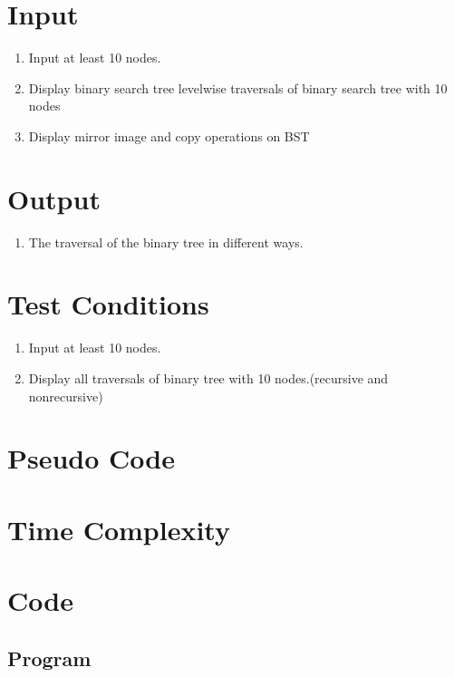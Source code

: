 \documentclass[11pt]{article}
\begin{document}
\section{Input}
\begin{enumerate}
	\item Input at least 10 nodes.
	\item Display binary search tree levelwise traversals of binary search tree with 10 nodes
	\item Display mirror image and copy operations on BST
\end{enumerate}
\section{Output}
\begin{enumerate}
	\item The traversal of the binary tree in different ways.
\end{enumerate}

\section{Test Conditions}
\begin{enumerate}
	\item Input at least 10 nodes.
	\item Display all traversals of binary tree with 10 nodes.(recursive and nonrecursive)
\end{enumerate}

\section{Pseudo Code}

\section{Time Complexity}

\section{Code}

\subsection{Program}

\end{document}

